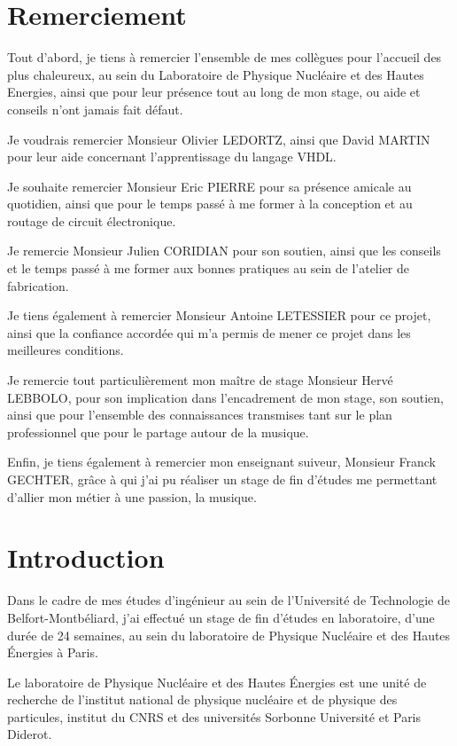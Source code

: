 \documentclass[french,a4paper,12pt]{report}
\begin{document}
  \chapter{Remerciement}
  Tout d'abord, je tiens à remercier l'ensemble de mes collègues pour l'accueil des plus chaleureux, au sein du Laboratoire de Physique Nucléaire et des Hautes Energies, ainsi que pour leur présence tout au long de mon stage, ou aide et conseils n'ont jamais fait défaut.
  
  Je voudrais remercier Monsieur Olivier LEDORTZ, ainsi que David MARTIN pour leur aide concernant l'apprentissage du langage VHDL.
  
  Je souhaite remercier Monsieur Eric PIERRE pour sa présence amicale au quotidien, ainsi que pour le temps passé à me former à la conception et au routage de circuit électronique.
  
  Je remercie Monsieur Julien CORIDIAN pour son soutien, ainsi que les conseils et le temps passé à me former aux bonnes pratiques au sein de l'atelier de fabrication.
  
  Je tiens également à remercier Monsieur Antoine LETESSIER pour ce projet, ainsi que la confiance accordée qui m'a permis de mener ce projet dans les meilleures conditions.
  
  Je remercie tout particulièrement mon maître de stage Monsieur Hervé LEBBOLO, pour son implication dans l'encadrement de mon stage, son soutien, ainsi que pour l'ensemble des connaissances transmises tant sur le plan professionnel que pour le partage autour de la musique.
  
  Enfin, je tiens également à remercier mon enseignant suiveur, Monsieur Franck GECHTER, grâce à qui j'ai pu réaliser un stage de fin d'études me permettant d'allier mon métier à une passion, la musique.
  
 \chapter{Introduction}

Dans le cadre de mes études d'ingénieur au sein de l'Université de Technologie de Belfort-Montbéliard, j'ai effectué un stage de fin d'études en laboratoire, d'une durée de 24 semaines, au sein du laboratoire de Physique Nucléaire et des Hautes Énergies à Paris.

Le laboratoire de Physique Nucléaire et des Hautes Énergies est une unité de recherche de l'institut national de physique nucléaire et de physique des particules, institut du CNRS et des universités Sorbonne Université et Paris Diderot.
\end{document}
